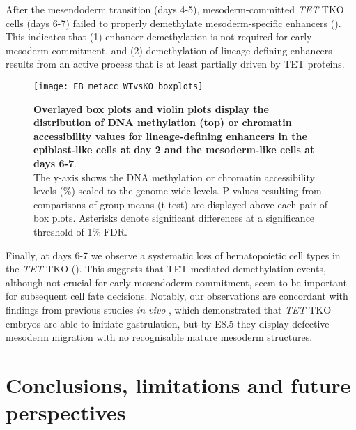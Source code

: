 After the mesendoderm transition (days 4-5), mesoderm-committed \textit{TET} TKO cells (days 6-7) failed to properly demethylate mesoderm-specific enhancers (). This indicates that (1) enhancer demethylation is not required for early mesoderm commitment, and (2) demethylation of lineage-defining enhancers results from an active process that is at least partially driven by TET proteins.

\begin{figure}[H]
	\centering
	\texttt{[image: EB\_metacc\_WTvsKO\_boxplots]}
	\caption[]{
	\textbf{Overlayed box plots and violin plots display the distribution of DNA methylation (top) or chromatin accessibility values for lineage-defining enhancers in the epiblast-like cells at day 2 and the mesoderm-like cells at days 6-7}.\\
	The y-axis shows the DNA methylation  or chromatin accessibility levels (\%) scaled to the genome-wide levels. P-values resulting from comparisons of group means (t-test) are displayed above each pair of box plots. Asterisks denote significant differences at a significance threshold of 1\% FDR.
	}
	\label{fig:EB_metacc_WTvsKO_boxplots}
\end{figure}

Finally, at days 6-7 we observe a systematic loss of hematopoietic cell types in the \textit{TET} TKO (). This suggests that TET-mediated demethylation events, although not crucial for early mesendoderm commitment, seem to be important for subsequent cell fate decisions. Notably, our observations are concordant with findings from previous studies \textit{in vivo} \cite{Dai2016}, which demonstrated that \textit{TET} TKO embryos are able to initiate
gastrulation, but by E8.5 they display defective mesoderm migration with no recognisable mature mesoderm structures.



\section{Conclusions, limitations and future perspectives}

